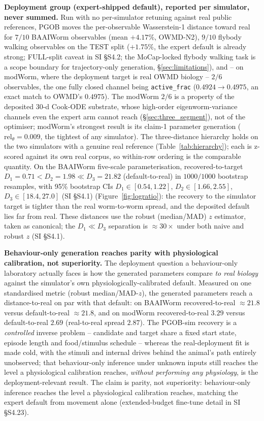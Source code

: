\documentclass[11pt]{article}
\begin{document}
\textbf{Deployment group (expert-shipped default), reported per simulator, never summed.} Run with no per-simulator retuning against real public references, PGOB moves the per-observable Wasserstein-1 distance toward real for $7/10$ BAAIWorm observables (mean $+4.17\%$, OWMD-N2), $9/10$ flybody walking observables on the TEST split ($+1.75\%$, the expert default is already strong; FULL-split caveat in SI \S S4.2; the MoCap-locked flybody walking task is a scope boundary for trajectory-only generation, \S\ref{sec:limitations}), and -- on modWorm, where the deployment target is real OWMD biology -- $2/6$ observables, the one fully closed channel being \texttt{active\_frac} ($0.4924{\to}0.4975$, an exact match to OWMD's $0.4975$). The modWorm $2/6$ is a property of the deposited $30$-d Cook-ODE substrate, whose high-order eigenworm-variance channels even the expert arm cannot reach (\S\ref{sec:three_segment}), not of the optimiser; modWorm's strongest result is its claim-1 parameter generation ($\mathrm{rel}_\theta{=}0.009$, the tightest of any simulator). The three-distance hierarchy holds on the two simulators with a genuine real reference (Table~\ref{tab:hierarchy}); each is z-scored against its own real corpus, so within-row ordering is the comparable quantity. On the BAAIWorm five-scale parameterisation, recovered-to-target $D_1{=}0.71<D_2{=}1.98\ll D_3{=}21.82$ (default-to-real) in $1000/1000$ bootstrap resamples, with 95\% bootstrap CIs $D_1\in[0.54,1.22]$, $D_2\in[1.66,2.55]$, $D_3\in[18.4,27.0]$ (SI \S S4.1) (Figure~\ref{fig:logratio}): the recovery to the simulator target is tighter than the real worm-to-worm spread, and the deposited default lies far from real. These distances use the robust (median/MAD) $z$ estimator, taken as canonical; the $D_1{\ll}D_3$ separation is $\approx30\times$ under both naive and robust $z$ (SI \S S4.1).

\textbf{Behaviour-only generation reaches parity with physiological calibration, not superiority.} The deployment question a behaviour-only laboratory actually faces is how the generated parameters compare \emph{to real biology} against the simulator's own physiologically-calibrated default. Measured on one standardised metric (robust median/MAD-$z$), the generated parameters reach a distance-to-real on par with that default: on BAAIWorm recovered-to-real $\approx21.8$ versus default-to-real $\approx21.8$, and on modWorm recovered-to-real $3.29$ versus default-to-real $2.69$ (real-to-real spread $2.87$). The PGOB-sim recovery is a \emph{controlled} inverse problem -- candidate and target share a fixed start state, episode length and food/stimulus schedule -- whereas the real-deployment fit is made cold, with the stimuli and internal drives behind the animal's path entirely unobserved; that behaviour-only inference under unknown inputs still reaches the level a physiological calibration reaches, \emph{without performing any physiology}, is the deployment-relevant result. The claim is parity, not superiority: behaviour-only inference reaches the level a physiological calibration reaches, matching the expert default from movement alone (extended-budget fine-tune detail in SI \S S4.23).
\end{document}
